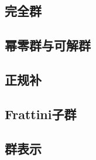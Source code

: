 \subsection{完全群}

\subsection{幂零群与可解群}

\subsection{正规补}

\subsection{Frattini子群}

\subsection{群表示}
